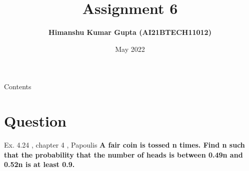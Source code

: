 \documentclass{beamer}
\title{Assignment 6}
\author{\textbf{Himanshu Kumar Gupta (AI21BTECH11012)}}
\date {May 2022}
\begin{document}
\begin{frame}
    \maketitle
\end{frame}

\begin{frame}{Contents}
\tableofcontents
\end{frame}
\section{Question}

\begin{frame}{Ex. 4.24 , chapter 4 , Papoulis}
    \textbf{A fair coin is tossed n times. Find n such that the probability that the number of heads is between 0.49n and 0.52n is at least 0.9.}
\end{frame}
\end{document}
